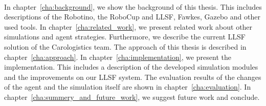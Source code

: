 \\
In chapter~\ref{cha:background}, we show the background of this thesis. This includes descriptions of the Robotino, the RoboCup and LLSF, Fawkes, Gazebo and other used tools. In chapter~\ref{cha:related_work}, we present related work about other simulations and agent strategies. Furthermore, we describe the current LLSF solution of the Carologistics team. The approach of this thesis is described in chapter~\ref{cha:approach}. In chapter~\ref{cha:implementation}, we present the implementation. This includes a description of the developed simulation modules and the improvements on our LLSF system. The evaluation results of the changes of the agent and the simulation itself are shown in chapter~\ref{cha:evaluation}. In chapter~\ref{cha:summery_and_future_work}, we suggest future work and conclude.


